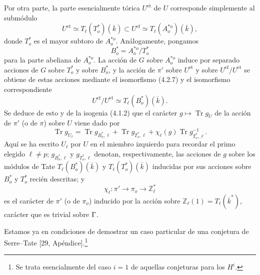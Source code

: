 Por otra parte, la parte esencialmente tórica $U^{\mathrm{et}}$ de $U$
corresponde simplemente al submódulo
\begin{equation}\tag{4.2.7}
 U^{\mathrm{et}}\simeq T_\ell(T^*_o)(\overline k)
 \subset U^{\mathrm{ef}}\simeq T_\ell(A^{*o}_o)(\overline k),
\end{equation}
donde $T^*_o$ es el mayor subtoro de $A^{*o}_o$. Análogamente, pongamos
\begin{equation}\tag{4.2.8}
 B^*_o=A^{*o}_o/T^*_o
\end{equation}
para la parte abeliana de $A^{*o}_o$. La acción de $G$ sobre
$A^{*o}_o$ induce por separado acciones de $G$ sobre $T^*_o$ y sobre
$B^*_o$, y la acción de $\pi'$ sobre $U^{\mathrm{et}}$ y sobre
$U^{\mathrm{ef}}/U^{\mathrm{et}}$ se obtiene de estas acciones mediante
el isomorfismo (4.2.7) y el isomorfismo correspondiente
\begin{equation}\tag{4.2.9}
 U^{\mathrm{ef}}/U^{\mathrm{et}}
 \simeq T_\ell(B^*_o)(\overline k).
\end{equation}
Se deduce de esto y de la isogenia (4.1.2) que el carácter
$g\longmapsto\operatorname{Tr}g_U$ de la acción de $\pi'$ (o de $\pi$)
sobre $U$ viene dado por
\begin{equation}\tag{4.2.10}
 \operatorname{Tr}g_{U_\ell}
 =\operatorname{Tr}g_{B^*_o,\ell}
 +\operatorname{Tr}g_{T^*_o,\ell}
 +\chi_\ell(g)\operatorname{Tr}g^{-1}_{T^*_o,\ell}.
\end{equation}
Aquí se ha escrito $U_\ell$ por $U$ en el miembro izquierdo para
recordar el primo elegido $\ell\ne p$; $g_{B^*_o,\ell}$ y
$g_{T^*_o,\ell}$ denotan, respectivamente, las acciones de $g$ sobre
los módulos de Tate $T_\ell(B^*_o)(\overline k)$ y
$T_\ell(T^*_o)(\overline k)$ inducidas por sus acciones sobre $B^*_o$
y $T^*_o$ recién descritas; y
\begin{equation}\tag{4.2.11}
 \chi_\ell:\pi'\longrightarrow\pi_o\longrightarrow\mathbb Z_\ell^*
\end{equation}
es el carácter de $\pi'$ (o de $\pi_o$) inducido por la acción sobre
$\mathbb Z_\ell(1)=T_\ell(\overline k^*)$, carácter que es trivial
sobre $\sisi{\Gamma^o}{\Gamma}$.

Estamos ya en condiciones de demostrar un caso particular de una
conjetura de Serre--Tate [29, Apéndice].\footnote{Se trata esencialmente
del caso $i=1$ de aquellas conjeturas para los $H^i$.}
